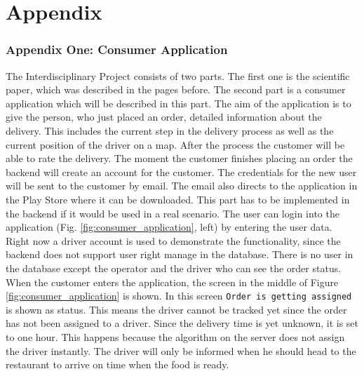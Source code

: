 \part*{Appendix}
\renewcommand{\thesection}{\arabic{section}}
\renewcommand{\theequation}{\arabic{equation}}
\section{Appendix One: Consumer Application}\label{section:Appendix One: Consumer Application}

The Interdisciplinary Project consists of two parts. The first one is the scientific paper, which was described in the pages before. The second part is a consumer application which will be described in this part.\newline
The aim of the application is to give the person, who just placed an order, detailed  information about the delivery. This includes the current step in the delivery process as well as the current position of the driver on a map. After the process the customer will be able to rate the delivery.\newline
The moment the customer finishes placing an order the backend will create an account for the customer. The credentials for the new user will be sent to the customer by email. The email also directs to the application in the Play Store where it can be downloaded. This part has to be implemented in the backend if it would be used in a real scenario.\newline
The user can login into the application (Fig. \ref{fig:consumer_application}, left) by entering the user data. Right now a driver account is used to demonstrate the functionality, since the backend does not support user right manage in the database. There is no user in the database except the operator and the driver who can see the order status.\newline
When the customer enters the application, the screen in the middle of Figure \ref{fig:consumer_application} is shown. In this screen \texttt{Order is getting assigned} is shown as status. This means the driver cannot be tracked yet since the order has not been assigned to a driver. Since the delivery time is yet unknown, it is set to one hour. This happens because the algorithm on the server does not assign the driver instantly. The driver will only be informed when he should head to the restaurant to arrive on time when the food is ready.\newline
